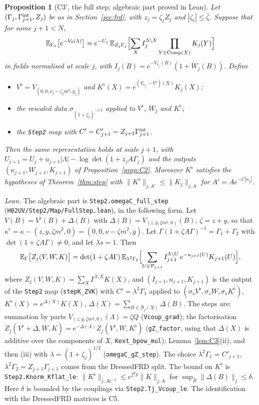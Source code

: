 \documentclass[11pt]{amsart}
\newtheorem{proposition}[theorem]{Proposition}
\theoremstyle{definition}
\theoremstyle{remark}
\numberwithin{equation}{section}
\newcommand{\E}{\mathbb{E}}
\newcommand{\cB}{\mathcal{B}}
\newcommand{\cP}{\mathcal{P}}
\begin{document}
\begin{proposition}[C3', the full step; algebraic part proved in Lean]\label{prop:C3}
Let $(\Gamma_j,\Gamma^{\rm int}_{j+1},Z_j)$ be as in Section~\ref{sec:frd}, with $z_j=\zeta_jZ_j$
and $|\zeta_i|\le\bar\zeta$. Suppose that for some $j+1<N$,
\[
  \E_{\Gamma_0}\bigl[e^{-V_0(\Lambda)}\bigr]=e^{-U_j}\,
  \E_{Z_j\Gamma_j}\Bigl[\sum_XI_j^{\Lambda\setminus X}\prod_{Y\in{\rm Comp}(X)}K_j(Y)\Bigr]
\]
in fields normalised at scale $j$, with $I_j(B)=e^{-V_{\kappa_j}(B)}(1+W_j(B))$. Define
\begin{itemize}
\item $V^\flat=V_{(0,0,\nu_j-\zeta_jm^2,g_j)}$ and $K^\flat(X)=e^{(V_{\kappa_j}-V^\flat)(X)}K_j(X)$;
\item the rescaled data $\sigma_{(1+\zeta_j)^{-1/2}}$ applied to $V^\flat$, $W_j$ and $K^\flat$;
\item the \texttt{Step2} map with $C'=C'_{j+1}=Z_{j+1}\Gamma^{\rm int}_{j+1}$.
\end{itemize}
Then the same representation holds at scale $j+1$, with
$U_{j+1}=U_j+u_{j+1}|\Lambda|-\log\det(1+z_jA\Gamma_j)$ and the outputs
$(\kappa_{j+1},W_{j+1},K_{j+1})$ of Proposition~\ref{prop:C2}. Moreover $K^\flat$ satisfies
the hypotheses of Theorem~\ref{thm:step} with
$\|K^\flat\|_{j,A'}\le\|K_j\|_{j,A}$ for $A'=Ae^{-C|\kappa_j|}$.
\end{proposition}
\noindent\emph{Lean.} The algebraic part is \texttt{Step2.omegaC\_full\_step}
(\texttt{H02UV/Step2/Map/FullStep.lean}), in the following form. Let $V(B)=V^\flat(B)+\Delta(B)$ with
$\Delta(B)=V_{(z,y,\zeta m^2,0)}(B)$, $\zeta=z+y$, so that $\kappa^\flat=\kappa-(z,y,\zeta m^2,0)
=(0,0,\nu-\zeta m^2,g)$. Let $\Gamma(1+\zeta A\Gamma)^{-1}=\Gamma_1+\Gamma_2$ with
$\det(1+\zeta A\Gamma)\ne0$, and let $\lambda s=1$. Then
\[
  \E_\Gamma\bigl[Z_j(V,W,K)\bigr]=\det(1+\zeta A\Gamma)\,
  \E_{\lambda^2\Gamma_2}\Bigl[\sum_{U\in\cP_{j+1}}I_{j+1}^{\Lambda\setminus U}\,
  e^{-u_{j+1}(U)}K_{j+1}(U)\Bigr],
\]
where $Z_j(V,W,K)=\sum_XI^{\Lambda\setminus X}K(X)$, and $(I_{j+1},u_{j+1},K_{j+1})$ is the
output of the \texttt{Step2} map (\texttt{stepK\_ZVK}) with $C'=\lambda^2\Gamma_1$ applied to
$(\sigma_sV^\flat,\sigma_sW,\sigma_sK^\flat)$, $K^\flat(X)=e^{\Delta(X)}K(X)$,
$\Delta(X)=\sum_{B\in\cB_j(X)}\Delta(B)$. The steps are: summation by parts
$V_{(z,y,\zeta m^2,0)}(\Lambda)=\zeta Q$ (\texttt{Vcoup\_grad}); the factorisation
$Z_j(V^\flat+\Delta,W,K)=e^{-\Delta(\Lambda)}Z_j(V^\flat,W,K^\flat)$ (\texttt{gZ\_factor},
using that $\Delta(X)$ is additive over the components of $X$, \texttt{Kext\_bpow\_mul});
Lemma~\ref{lem:C3}(ii), and then (iii) with $\lambda=(1+\zeta_j)^{1/2}$
(\texttt{omegaC\_gZ\_step}). The choice $\lambda^2\Gamma_1=C'_{j+1}$, $\lambda^2\Gamma_2=Z_{j+1}\Gamma_{j+1}$
comes from the DressedFRD split. The bound on $K^\flat$ is \texttt{Step2.Knorm\_Kflat\_le}:
$\|K^\flat\|_{j,Ae^{-\delta}}\le e^{2^d\delta}\|K\|_{j,A}$ for $\sup_B\|\Delta(B)\|_j\le\delta$. Here
$\delta$ is bounded by the couplings via \texttt{Step2.Tj\_Vcoup\_le}. The identification with the
DressedFRD matrices is C5.
\end{document}
